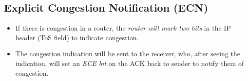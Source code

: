 \documentclass{article}
\begin{document}
\subsection{Explicit Congestion Notification (ECN)}

\begin{itemize}
\item If there is congestion in a router, the \emph{router will mark two bits} in the IP header (ToS field) to indicate congestion.
\item The congestion indication will be sent to the receiver, who, after seeing the indication, will set an \emph{ECE bit} on the ACK back to sender to notify them of congestion.
\end{itemize}
\end{document}
